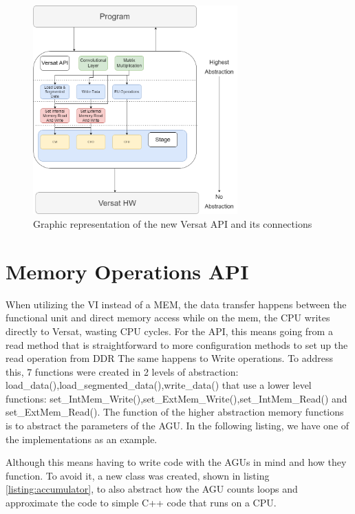 \begin{figure}[!htbp]
    \centering
    \includegraphics[width=0.7\textwidth]{Figures/VersatMemory.drawio.png}
    \caption{Graphic representation of the new Versat API and its connections}
    \label{newAPI}
\end{figure} 


\section{Memory Operations API}

When utilizing the VI instead of a MEM, the data transfer happens between the functional unit and direct memory access while
on the mem, the CPU writes directly to Versat, wasting CPU cycles. For the API, this means going from a read method that is straightforward
to more configuration methods to set up the read operation from DDR The same happens to Write operations. To address this, 7 functions were created in 2 levels of abstraction:
load\_data(),load\_segmented\_data(),write\_data() that use a lower level functions: set\_IntMem\_Write(),set\_ExtMem\_Write(),set\_IntMem\_Read() and set\_ExtMem\_Read().
The function of the higher abstraction memory functions is to abstract the parameters of the AGU. In the following listing, we have one of the implementations
as an example.




Although this means having to write code with the AGUs in mind
and how they function. To avoid it, a new class was created, shown in listing \ref*{listing:accumulator},
to also abstract how the AGU counts loops and approximate 
the code to simple C++ code that runs on a CPU.

